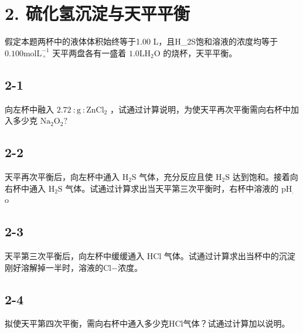 \section*{2. 硫化氢沉淀与天平平衡}
假定本题两杯中的液体体积始终等于1.00 L，且H_{2}S饱和溶液的浓度均等于 $0 . 1 0 0 \mathrm { m o l } \mathrm { L } _ { \mathrm { ~ } \circ } ^ { - 1 }$ 天平两盘各有⼀盛着 $1 . 0 \mathrm { { L H _ { 2 } O } }$ 的烧杯，天平平衡。

\subsection*{2-1}
向左杯中融⼊ $2 . 7 2 \ : \mathrm { g } \ : \mathrm { Z n C l _ { 2 } }$ ，试通过计算说明，为使天平再次平衡需向右杯中加⼊多少克 $\mathrm { N a _ { 2 } O _ { 2 } ? }$

\subsection*{2-2}
天平再次平衡后，向左杯中通⼊ $\mathrm { H } _ { 2 } \mathrm { S }$ ⽓体，充分反应且使 $\mathrm { H } _ { 2 } \mathrm { S }$ 达到饱和。接着向右杯中通⼊ $\mathrm { H } _ { 2 } \mathrm { S }$ ⽓体。试通过计算求出当天平第三次平衡时，右杯中溶液的 $\mathrm { p H } _ { \cdot }$ o

\subsection*{2-3}
天平第三次平衡后，向左杯中缓缓通⼊ $\mathrm { H C l }$ ⽓体。试通过计算求出当杯中的沉淀刚好溶解掉⼀半时，溶液的Cl−浓度。

\subsection*{2-4}
拟使天平第四次平衡，需向右杯中通⼊多少克HCl⽓体？试通过计算加以说明。

